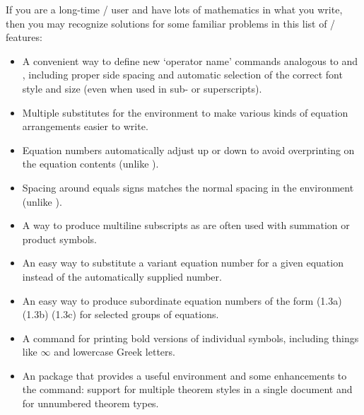 \documentclass[leqno,titlepage,openany]{amsldoc}
\newcommand{\rhcn}{}%
\begin{document}
If you are a long-time \latex/ user and have lots of mathematics in what
you write, then you may recognize solutions for some familiar problems
in this list of \amslatex/ features:
\begin{itemize}

\item A convenient way to define new `operator name' commands analogous
to  and , including proper side spacing and automatic
selection of the correct font style and size (even when used in
sub- or superscripts).

\item Multiple substitutes for the  environment to make
various kinds of equation arrangements easier to write.

\item Equation numbers automatically adjust up or down to avoid
overprinting on the equation contents (unlike ).

\item Spacing around equals signs matches the normal spacing in the
 environment (unlike ).

\item A way to produce multiline subscripts as are often used with
summation or product symbols.

\item An easy way to substitute a variant equation number for a given
equation instead of the automatically supplied number.

\item An easy way to produce subordinate equation numbers of the form
(1.3a) (1.3b) (1.3c) for selected groups of equations.

\item A  command for printing bold versions of
individual symbols, including things like $\infty$ and lowercase Greek
letters.

\item An  package that provides a useful 
environment and some enhancements to the  command:
support for multiple theorem styles in a single document and
for unnumbered theorem types.

\end{itemize}

\mainmatter
\renewcommand{\rhcn}{\thechapter. }
\end{document}
